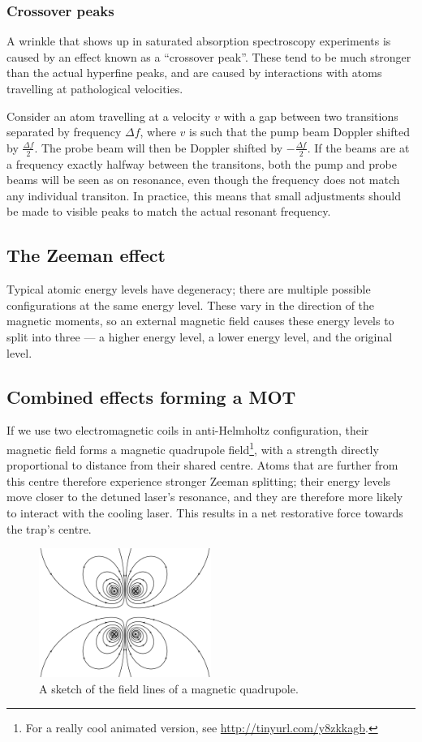 \documentclass[11pt,twoside,a4paper]{article}
\begin{document}
\subsubsection{Crossover peaks}
A wrinkle that shows up in saturated absorption spectroscopy experiments is caused by an effect known as a ``crossover peak''. These tend to be much stronger than the actual hyperfine peaks, and are caused by interactions with atoms travelling at pathological velocities.

Consider an atom travelling at a velocity \(v\) with a gap between two transitions separated by frequency \(\Delta f\), where \(v\) is such that the pump beam Doppler shifted by \(\frac{\Delta f}{2}\). The probe beam will then be Doppler shifted by \(-\frac{\Delta f}{2}\). If the beams are at a frequency exactly halfway
between the transitons, both the pump and probe beams will be seen as on resonance, even though the frequency does not match any individual transiton. In practice, this means that small adjustments should be made to visible peaks to match the actual resonant frequency.
\subsection{The Zeeman effect}
Typical atomic energy levels have degeneracy; there are multiple possible configurations at the same energy level. These vary in the direction of the magnetic moments, so an external magnetic field causes these energy levels to split into three --- a higher energy level, a lower energy level, and the original level.
\subsection{Combined effects forming a MOT}
If we use two electromagnetic coils in anti-Helmholtz configuration, their magnetic field forms a magnetic quadrupole field\footnote{For a really cool animated version, see \url{http://tinyurl.com/y8zkkagb}.}, with a strength directly proportional to distance from their shared centre. Atoms that are further from this centre therefore experience stronger Zeeman splitting; their energy levels move closer to
the detuned laser's resonance, and they are therefore more likely to interact with the cooling laser. This results in a net restorative force towards the trap's centre.
\begin{figure}[h]
    \centering
    \includegraphics[width=0.5\textwidth]{images/quadrupole.png}
    \caption{
        A sketch of the field lines of a magnetic quadrupole.
    \cite{wikiquad}}
\end{figure}
\end{document}
